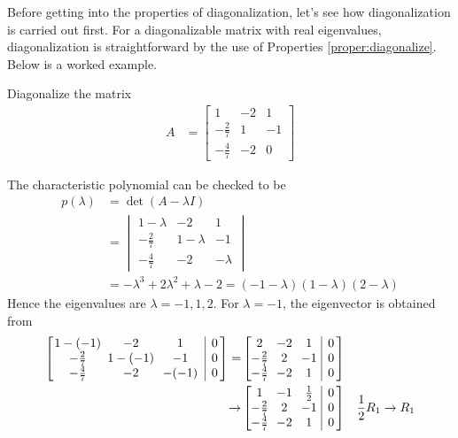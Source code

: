 Before getting into the properties of diagonalization, let's see how diagonalization is carried out first. For a diagonalizable matrix with real eigenvalues, diagonalization is straightforward by the use of Properties \ref{proper:diagonalize}. Below is a worked example.
\begin{exmp}
Diagonalize the matrix 
\begin{align*}
A &= 
\begin{bmatrix}
1 & -2 & 1 \\ 
-\frac{2}{7} & 1 & -1 \\ 
-\frac{4}{7} & -2 & 0
\end{bmatrix}
\end{align*}
\end{exmp}
\begin{solution}
The characteristic polynomial can be checked to be 
\begin{align*}
p(\lambda) &= \det(A - \lambda I) \\
&= \begin{vmatrix}
1-\lambda & -2 & 1 \\ 
-\frac{2}{7} & 1-\lambda & -1 \\ 
-\frac{4}{7} & -2 & -\lambda
\end{vmatrix} \\
&= -\lambda^3 + 2\lambda^2 + \lambda - 2 = (-1-\lambda)(1-\lambda)(2-\lambda)
\end{align*}
Hence the eigenvalues are $\lambda = -1,1,2$. For $\lambda = -1$, the eigenvector is obtained from
\begin{align*}
\left[\begin{array}{@{\,}wc{36pt}wc{30pt}wc{30pt}|c@{\,}}
1-(-1) & -2 & 1 & 0\\ 
-\frac{2}{7} & 1-(-1) & -1 & 0\\ 
-\frac{4}{7} & -2 & -(-1) & 0
\end{array}\right] 
=& 
\left[\begin{array}{@{\,}wc{10pt}wc{10pt}wc{10pt}|c@{\,}}
2 & -2 & 1 & 0\\ 
-\frac{2}{7} & 2 & -1 & 0\\ 
-\frac{4}{7} & -2 & 1 & 0
\end{array}\right] \\
\to&
\left[\begin{array}{@{\,}wc{10pt}wc{10pt}wc{10pt}|c@{\,}}
1 & -1 & \frac{1}{2} & 0\\ 
-\frac{2}{7} & 2 & -1 & 0\\ 
-\frac{4}{7} & -2 & 1 & 0
\end{array}\right] & \frac{1}{2}R_1 \to R_1 \\

\end{align*}
\end{solution}
